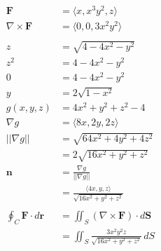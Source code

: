\documentclass{article}
\begin{document}
\begin{align*}
  \mathbf{F}                            & = \langle x, x^3 y^2, z \rangle                                                               \\
  \nabla \times \mathbf{F}              & = \langle 0, 0, 3 x^2 y^2 \rangle                                                             \\ \\
  z                                     & = \sqrt{4 - 4 x^2 - y^2}                                                                      \\
  z^2                                   & = 4 - 4 x^2 - y^2                                                                             \\
  0                                     & = 4 - 4 x^2 - y^2                                                                             \\
  y                                     & = 2 \sqrt{1 - x^2}                                                                            \\
  g(x, y, z)                            & = 4 x^2 + y^2 + z^2 - 4                                                                       \\
  \nabla g                              & = \langle 8 x, 2 y, 2 z \rangle                                                               \\
  ||\nabla g||                          & = \sqrt{64 x^2 + 4 y^2 + 4 z^2}                                                               \\
                                        & = 2 \sqrt{16 x^2 + y^2 + z^2}                                                                 \\
  \mathbf{n}                            & = \frac{\nabla g}{||\nabla g||}                                                               \\
                                        & = \frac{\langle 4 x, y, z \rangle}{\sqrt{16 x^2 + y^2 + z^2}}                                 \\ \\
  \oint_C \mathbf{F} \cdot d \mathbf{r} & = \iint_S (\nabla \times \mathbf{F}) \cdot d \mathbf{S}                                       \\
                                        & = \iint_S \frac{3 x^2 y^2 z}{\sqrt{16 x^2 + y^2 + z^2}} \,dS                                  \\

\end{align*}
\end{document}
